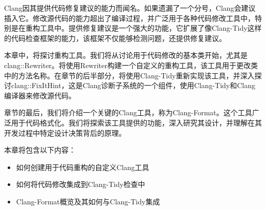 
Clang因其提供代码修复建议的能力而闻名。如果遗漏了一个分号，Clang会建议插入它。修改源代码的能力超出了编译过程，并广泛用于各种代码修改工具中，特别是在重构工具中。提供修复建议是一个强大的功能，它扩展了像Clang-Tidy这样的代码检查框架的能力，该框架不仅能够检测问题，还提供修复建议。

本章中，将探讨重构工具。我们将从讨论用于代码修改的基本类开始，尤其是clang::Rewriter。将使用Rewriter构建一个自定义的重构工具，该工具用于更改类中的方法名称。在章节的后半部分，将使用Clang-Tidy重新实现该工具，并深入探讨clang::FixItHint，这是Clang诊断子系统的一个组件，使用Clang-Tidy和Clang编译器来修改源代码。

章节的最后，我们将介绍一个关键的Clang工具，称为Clang-Format。这个工具广泛用于代码格式化。我们将探索该工具提供的功能，深入研究其设计，并理解在其开发过程中特定设计决策背后的原理。

本章将包含以下内容：

\begin{itemize}
\item
如何创建用于代码重构的自定义Clang工具

\item
如何将代码修改集成到Clang-Tidy检查中

\item
Clang-Format概览及其如何与Clang-Tidy集成
\end{itemize}
















